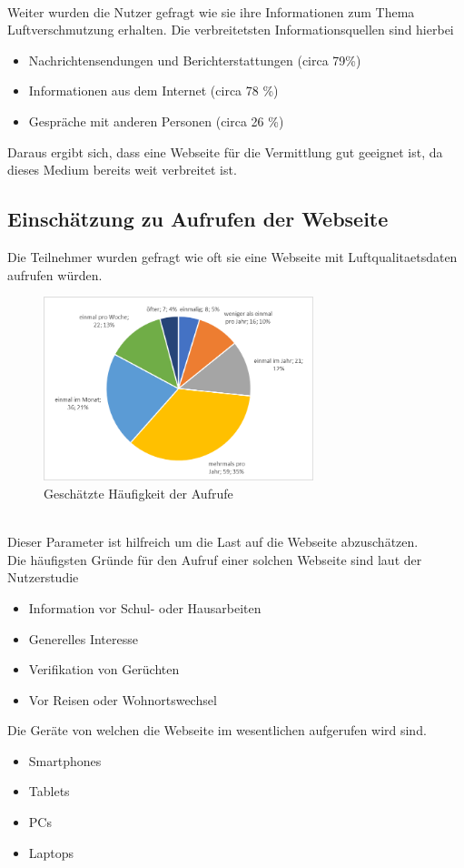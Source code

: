 \\
Weiter wurden die Nutzer gefragt wie sie ihre Informationen zum Thema Luftverschmutzung erhalten. Die verbreitetsten Informationsquellen sind hierbei
\begin{itemize} [noitemsep]
    \item Nachrichtensendungen und Berichterstattungen (circa 79\%)
    \item Informationen aus dem Internet (circa 78 \%)
    \item Gespräche mit anderen Personen (circa 26 \%)
\end{itemize}
Daraus ergibt sich, dass eine Webseite für die Vermittlung gut geeignet ist, da dieses Medium bereits weit verbreitet ist.

\subsection{Einschätzung zu Aufrufen der Webseite}
Die Teilnehmer wurden gefragt wie oft sie eine Webseite mit \gls{Luftqualitaetsdaten} aufrufen würden.
\\
\begin{figure}[h]
    \centering
    \includegraphics[width=0.7\textwidth]{media/diagram/aufrufe.png}
    \caption{Geschätzte Häufigkeit der Aufrufe}
\end{figure}
\\
Dieser Parameter ist hilfreich um die Last auf die Webseite abzuschätzen.
\\
Die häufigsten Gründe für den Aufruf einer solchen Webseite sind laut der Nutzerstudie
\begin{itemize} [noitemsep]
    \item Information vor Schul- oder Hausarbeiten
    \item Generelles Interesse
    \item Verifikation von Gerüchten
    \item Vor Reisen oder Wohnortswechsel
\end{itemize}
Die Geräte von welchen die Webseite im wesentlichen aufgerufen wird sind.
\begin{itemize} [noitemsep]
    \item Smartphones
    \item Tablets
    \item PCs
    \item Laptops
\end{itemize}

